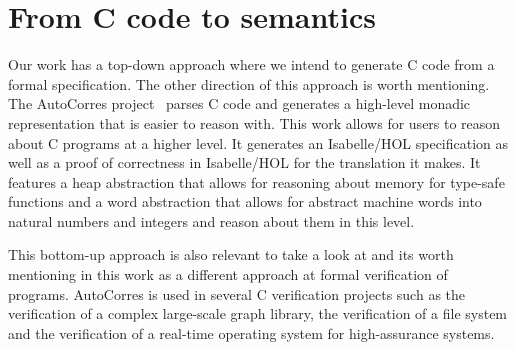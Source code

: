 \section{From C code to semantics}

Our work has a top-down approach where we intend to generate C code from a formal specification.
The other direction of this approach is worth mentioning.
The AutoCorres project~\parencite{autocorres} parses C code and generates a high-level monadic representation that is easier to reason with.
This work allows for users to reason about C programs at a higher level.
It generates an Isabelle/HOL specification as well as a proof of correctness in Isabelle/HOL for the translation it makes.
It features a heap abstraction that allows for reasoning about memory for type-safe functions and a word abstraction that allows for abstract machine words into natural numbers and integers and reason about them in this level.

This bottom-up approach is also relevant to take a look at and its worth mentioning in this work as a different approach at formal verification of programs.
AutoCorres is used in several C verification projects such as the verification of a complex large-scale graph library, the verification of a file system and the verification of a real-time operating system for high-assurance systems.
